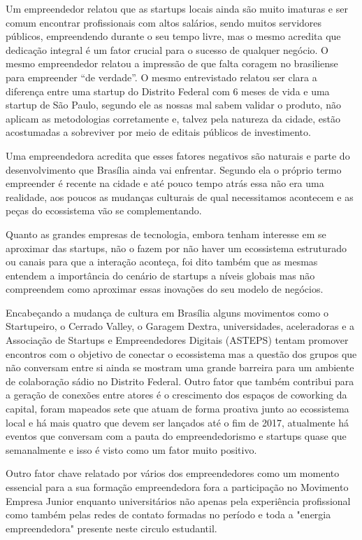 Um empreendedor relatou que as startups locais ainda são muito imaturas e ser comum encontrar profissionais com altos salários, sendo muitos servidores públicos, empreendendo durante o seu tempo livre, mas o mesmo acredita que dedicação integral é um fator crucial para o sucesso de qualquer negócio. O mesmo empreendedor relatou a impressão de que falta coragem no brasiliense para empreender ``de verdade''. O mesmo entrevistado relatou ser clara a diferença entre uma startup do Distrito Federal com 6 meses de vida e uma startup de São Paulo, segundo ele as nossas mal sabem validar o produto, não aplicam as metodologias corretamente e, talvez pela natureza da cidade, estão acostumadas a sobreviver por meio de editais públicos de investimento.

Uma empreendedora acredita que esses fatores negativos são naturais e parte do desenvolvimento que Brasília ainda vai enfrentar. Segundo ela o próprio termo empreender é recente na cidade e até pouco tempo atrás essa não era uma realidade, aos poucos as mudanças culturais de qual necessitamos acontecem e as peças do ecossistema vão se complementando.

Quanto as grandes empresas de tecnologia, embora tenham interesse em se aproximar das startups, não o fazem por não haver um ecossistema estruturado ou canais para que a interação aconteça, foi dito também que as mesmas entendem a importância do cenário de startups a níveis globais mas não compreendem como aproximar essas inovações do seu modelo de negócios. 

Encabeçando a mudança de cultura em Brasília alguns movimentos como o Startupeiro, o Cerrado Valley, o Garagem Dextra, universidades, aceleradoras e a Associação de Startups e Empreendedores Digitais (ASTEPS) tentam promover encontros com o objetivo de conectar o ecossistema mas a questão dos grupos que não conversam entre si ainda se mostram uma grande barreira para um ambiente de colaboração sádio no Distrito Federal. Outro fator que também contribui para a geração de conexões entre atores é o crescimento dos espaços de coworking da capital, foram mapeados sete que atuam de forma proativa junto ao ecossistema local e há mais quatro que devem ser lançados até o fim de 2017, atualmente há eventos que conversam com a pauta do empreendedorismo e startups quase que semanalmente e isso é visto como um fator muito positivo. 

Outro fator chave relatado por vários dos empreendedores como um momento essencial para a sua formação empreendedora fora a participação no Movimento Empresa Junior enquanto universitários não apenas pela experiência profissional como também pelas redes de contato formadas no período e toda a "energia empreendedora" presente neste circulo estudantil. 

